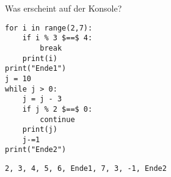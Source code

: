 \question[4] Was erscheint auf der Konsole?
\begin{lstlisting}
for i in range(2,7):
    if i % 3 $==$ 4:
        break
    print(i)
print("Ende1")
j = 10
while j > 0:
    j = j - 3
    if j % 2 $==$ 0:
        continue
    print(j)
    j-=1
print("Ende2")
\end{lstlisting}
\begin{solutionbox}{2cm}
\begin{lstlisting}
2, 3, 4, 5, 6, Ende1, 7, 3, -1, Ende2
\end{lstlisting}
\end{solutionbox}
